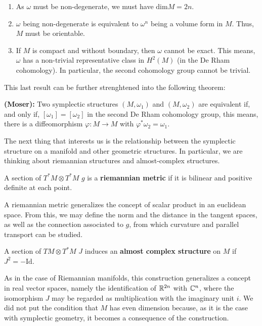 \begin{enumerate}
	\item As $\omega$ must be non-degenerate, we must have $\text{dim}M = 2n$.
	\item $\omega$ being non-degenerate is equivalent to $\omega^n$ being a volume form in $M$. Thus, $M$ must be orientable.
	\item If $M$ is compact and without boundary, then $\omega$ cannot be exact. This means, $\omega$ has a non-trivial representative class in $H^2(M)$ (in the De Rham cohomology). In particular, the second cohomology group cannot be trivial.
\end{enumerate}

This last result can be further strenghtened into the following theorem:

\begin{theo}
{\bf (Moser):} Two symplectic structures $(M,\omega_1)$ and $(M,\omega_2)$ are equivalent if, and only if, $[\omega_1] = [\omega_2]$ in the second De Rham cohomology group, this means, there is a diffeomorphism $\varphi : M \rightarrow M$ with $\varphi^{\ast}\omega_2 = \omega_1$.
\end{theo}

The next thing that interests us is the relationship between the symplectic structure on a manifold and other geometric structures. In particular, we are thinking about riemannian structures and almost-complex structures.

\begin{deff}
A section of $T^{\ast}M \otimes T^{\ast}M$ $g$ is a {\bf riemannian metric} if it is bilinear and positive definite at each point.
\end{deff}

A riemannian metric generalizes the concept of scalar product in an euclidean space. From this, we may define the norm and the distance in the tangent spaces, as well as the connection associated to $g$, from which curvature and parallel transport can be studied.

\begin{deff}
A section of $TM \otimes T^{\ast}M$ $J$ induces an {\bf almost complex structure} on $M$ if $J^2 = - \text{Id}$.
\end{deff}

As in the case of Riemannian manifolds, this construction generalizes a concept in real vector spaces, namely the identification of $\mathbb{R}^{2n}$ with $\mathbb{C}^n$, where the isomorphism $J$ may be regarded as multiplication with the imaginary unit $i$. We did not put the condition that $M$ has even dimension because, as it is the case with symplectic geometry, it becomes a consequence of the construction.

